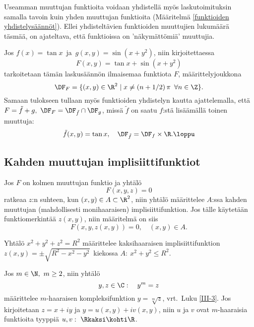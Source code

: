 Useamman muuttujan funktioita voidaan yhdistellä myös laskutoimituksin samalla tavoin kuin
yhden muuttujan funktioita (Määritelmä \ref{funktioiden yhdistelysäännöt}).  Ellei
yhdisteltävien funktioiden muuttujien lukumäärä täsmää, on ajateltava, että funktioissa on 
'näkymättömiä' muuttujia. 
\begin{Exa} Jos $f(x) = \tan x\,$ ja $\,g(x,y) = \sin(x+y^2)$, niin kirjoitettaessa
\[ 
F(x,y) = \tan x + \sin (x+y^2) 
\]
tarkoitetaan tämän laskusäännön ilmaisemaa funktiota $F$, määrittelyjoukkona 
\[ 
\DF_F = \{(x,y) \in \R^2 \mid x \neq (n+1/2)\,\pi\,\ \forall n \in \Z\}.
\]
Samaan tulokseen tullaan myös funktioiden yhdistelyn kautta ajattelemalla, että
$F = \tilde{f} + g,\ \DF_F = \DF_{\tilde{f}} \cap \DF_g$, missä $\tilde{f}$ on saatu $f$:stä
lisäämällä toinen muuttuja:
\[ 
\tilde{f}(x,y) = \tan x, \quad \DF_{\tilde{f}} = \DF_f \times \R. \loppu
\] 
\end{Exa}

\subsection*{Kahden muuttujan implisiittifunktiot}

Jos $F$ on kolmen muuttujan funktio ja yhtälö
\[
F(x,y,z)=0
\]
ratkeaa $z$:n suhteen, kun $(x,y)\in A\subset\R^2$, niin yhtälö määrittelee $A$:ssa
kahden muuttujan (mahdollisesti monihaaraisen) implisiittifunktion. Jos tälle käytetään
funktiomerkintää $z(x,y)$, niin määritelmä on siis
\[
F(x,y,z(x,y))=0, \quad (x,y)\in A.
\]
\begin{Exa}
Yhtälö $x^2+y^2+z^2=R^2$ määrittelee kaksihaaraisen implisiittifunktion
$z(x,y)=\pm\sqrt{R^2-x^2-y^2}\,$ kiekossa $A:\ x^2+y^2 \le R^2$. \loppu
\end{Exa}
\begin{Exa} Jos $m\in\N,\ m \ge 2$, niin yhtälö
\[
y,z\in\C: \quad y^m=z
\]
määrittelee $m$-haaraisen kompleksifunktion $y=\sqrt[m]{z}$, vrt.\ Luku \ref{III-3}.
Jos kirjoitetaan $z=x+iy$ ja $y=u(x,y)+iv(x,y)$, niin $u$ ja $v$ ovat $m$-haaraisia
funktioita tyyppiä $u,v:\ \Rkaksi\kohti\R$. \loppu
\end{Exa}

